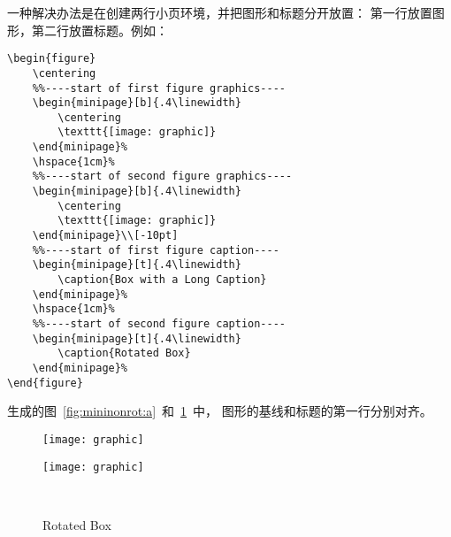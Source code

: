 一种解决办法是在创建两行小页环境，并把图形和标题分开放置：
第一行放置图形，第二行放置标题。例如：
\begin{lstlisting}
\begin{figure}
	\centering
	%%----start of first figure graphics----
	\begin{minipage}[b]{.4\linewidth}
		\centering
		\texttt{[image: graphic]}
	\end{minipage}%
	\hspace{1cm}%
	%%----start of second figure graphics----
	\begin{minipage}[b]{.4\linewidth}
		\centering
		\texttt{[image: graphic]}
	\end{minipage}\\[-10pt]
	%%----start of first figure caption----
	\begin{minipage}[t]{.4\linewidth}
		\caption{Box with a Long Caption}
	\end{minipage}%
	\hspace{1cm}%
	%%----start of second figure caption----
	\begin{minipage}[t]{.4\linewidth}
		\caption{Rotated Box}
	\end{minipage}%
\end{figure}
\end{lstlisting}
生成的图~\ref{fig:mininonrot:a}~和~\ref{fig:minirot:a}~中，
图形的基线和标题的第一行分别对齐。

\begin{figure}
	\centering
	\begin{minipage}[b]{.4\linewidth}
		\centering
		\texttt{[image: graphic]}
	\end{minipage}%
	\hspace{1cm}%
	\begin{minipage}[b]{.4\linewidth}
		\centering
		\texttt{[image: graphic]}
	\end{minipage}\\[-10pt]
	\begin{minipage}[t]{.4\linewidth}
		\caption{Box with a Long Caption}\label{fig:mininonrot:a}
	\end{minipage}%
	\hspace{1cm}%
	\begin{minipage}[t]{.4\linewidth}
		\caption{Rotated Box}\label{fig:minirot:a}
	\end{minipage}%
\end{figure}

